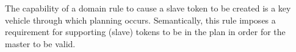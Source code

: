 \begin{description}
The capability of a domain rule to cause a slave token to be created
is a key vehicle through which planning occurs. Semantically, this
rule imposes a requirement for supporting (slave) tokens to be in the
plan in order for the master to be valid.


\end{description}



